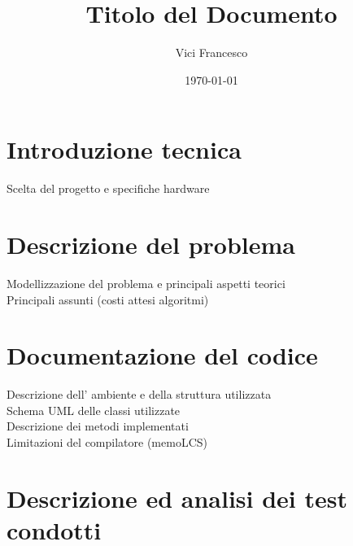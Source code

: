 \documentclass{article}
\begin{document}
	
	
	\title{Titolo del Documento}
	\author{Vici Francesco}
	\date{\today} %

	\maketitle

	\section{Introduzione tecnica}
	Scelta del progetto e specifiche hardware \\

	\section{Descrizione del problema}
	Modellizzazione del problema e principali aspetti teorici \\
	Principali assunti (costi attesi algoritmi) \\

	\section{Documentazione del codice}
	Descrizione dell' ambiente e della struttura utilizzata \\
	Schema UML delle classi utilizzate \\
	Descrizione dei metodi implementati \\ 
	Limitazioni del compilatore (memoLCS) \\

	\section{Descrizione ed analisi dei test condotti}
	
	
\end{document}
